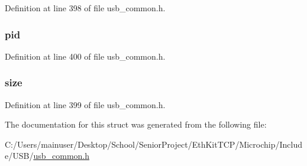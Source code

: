 Definition at line 398 of file usb\+\_\+common.\+h.

\hypertarget{struct__transfer__event__data_a52de365b57c2f7a8b4302c9341d7aa9c}{}
\subsubsection[{pid}]{ pid}\label{struct__transfer__event__data_a52de365b57c2f7a8b4302c9341d7aa9c}


Definition at line 400 of file usb\+\_\+common.\+h.

\hypertarget{struct__transfer__event__data_a6d4bac4be8d2f0ee400eb63ac2204aac}{}
\subsubsection[{size}]{ size}\label{struct__transfer__event__data_a6d4bac4be8d2f0ee400eb63ac2204aac}


Definition at line 399 of file usb\+\_\+common.\+h.



The documentation for this struct was generated from the following file\+:\begin{DoxyCompactItemize}
\item 
C\+:/\+Users/mainuser/\+Desktop/\+School/\+Senior\+Project/\+Eth\+Kit\+T\+C\+P/\+Microchip/\+Include/\+U\+S\+B/\hyperlink{usb__common_8h}{usb\+\_\+common.\+h}\end{DoxyCompactItemize}
